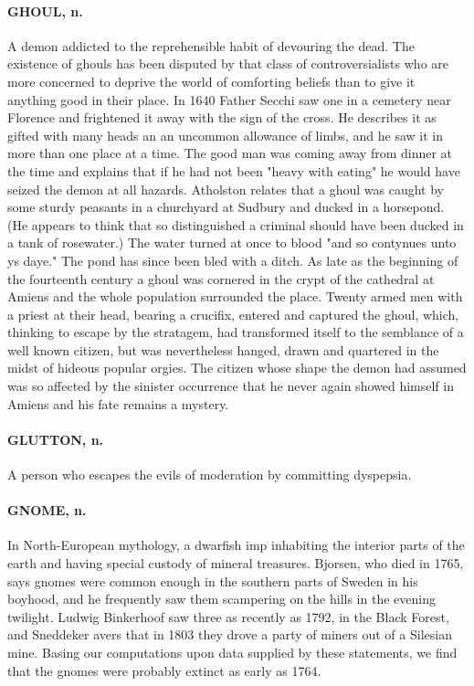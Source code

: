 \documentclass[11pt]{article}
\begin{document}
\paragraph{GHOUL, n.}  A demon addicted to the reprehensible habit of devouring
the dead.  The existence of ghouls has been disputed by that class of
controversialists who are more concerned to deprive the world of
comforting beliefs than to give it anything good in their place.  In
1640 Father Secchi saw one in a cemetery near Florence and frightened
it away with the sign of the cross.  He describes it as gifted with
many heads an an uncommon allowance of limbs, and he saw it in more
than one place at a time.  The good man was coming away from dinner at
the time and explains that if he had not been "heavy with eating" he
would have seized the demon at all hazards.  Atholston relates that a
ghoul was caught by some sturdy peasants in a churchyard at Sudbury
and ducked in a horsepond.  (He appears to think that so distinguished
a criminal should have been ducked in a tank of rosewater.)  The water
turned at once to blood "and so contynues unto ys daye."  The pond has
since been bled with a ditch.  As late as the beginning of the
fourteenth century a ghoul was cornered in the crypt of the cathedral
at Amiens and the whole population surrounded the place.  Twenty armed
men with a priest at their head, bearing a crucifix, entered and
captured the ghoul, which, thinking to escape by the stratagem, had
transformed itself to the semblance of a well known citizen, but was
nevertheless hanged, drawn and quartered in the midst of hideous
popular orgies.  The citizen whose shape the demon had assumed was so
affected by the sinister occurrence that he never again showed himself
in Amiens and his fate remains a mystery.

\paragraph{GLUTTON, n.}  A person who escapes the evils of moderation by
committing dyspepsia.

\paragraph{GNOME, n.}  In North-European mythology, a dwarfish imp inhabiting the
interior parts of the earth and having special custody of mineral
treasures.  Bjorsen, who died in 1765, says gnomes were common enough
in the southern parts of Sweden in his boyhood, and he frequently saw
them scampering on the hills in the evening twilight.  Ludwig
Binkerhoof saw three as recently as 1792, in the Black Forest, and
Sneddeker avers that in 1803 they drove a party of miners out of a
Silesian mine.  Basing our computations upon data supplied by these
statements, we find that the gnomes were probably extinct as early as
1764.
\end{document}
